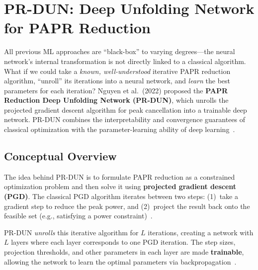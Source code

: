 \chapter{PR-DUN: Deep Unfolding Network for PAPR Reduction}
\label{ch:prdun}

\begin{motivation}
    All previous ML approaches are ``black-box'' to varying degrees---the
    neural network's internal transformation is not directly linked to a
    classical algorithm.  What if we could take a \emph{known, well-understood}
    iterative PAPR reduction algorithm, ``unroll'' its iterations into a
    neural network, and \emph{learn} the best parameters for each iteration?
    Nguyen et al.\ (2022) proposed the \textbf{PAPR Reduction Deep Unfolding
    Network (PR-DUN)}, which unrolls the projected gradient descent algorithm
    for peak cancellation into a trainable deep network.
    PR-DUN combines the interpretability and convergence guarantees of
    classical optimization with the parameter-learning ability of deep
    learning~\cite{nguyen2022deep}.
\end{motivation}


\section{Conceptual Overview}
\label{sec:prdun_concept}

The idea behind PR-DUN is to formulate PAPR reduction as a constrained
optimization problem and then solve it using \textbf{projected gradient
descent (PGD)}.  The classical PGD algorithm iterates between two steps:
(1)~take a gradient step to reduce the peak power, and
(2)~project the result back onto the feasible set (e.g., satisfying
a power constraint)~\cite{nguyen2022deep}.

PR-DUN \emph{unrolls} this iterative algorithm for $L$ iterations,
creating a network with $L$ layers where each layer corresponds to one
PGD iteration.  The step sizes, projection thresholds, and other parameters
in each layer are made \textbf{trainable}, allowing the network to learn
the optimal parameters via backpropagation~\cite{nguyen2022deep}.

